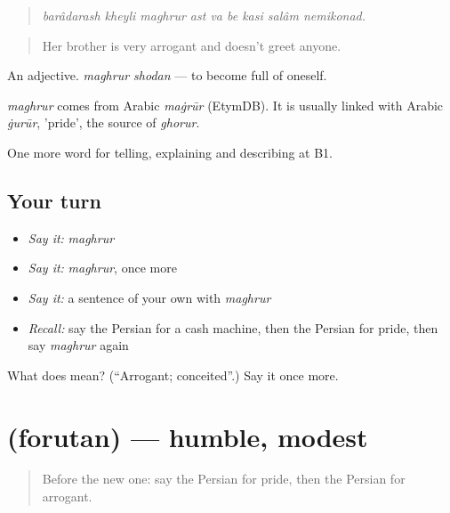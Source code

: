 \begin{quote}
\emph{barâdarash kheyli maghrur ast va be kasi salâm nemikonad.}
\end{quote}

\begin{quote}
Her brother is very arrogant and doesn't greet anyone.
\end{quote}

An adjective. \emph{maghrur shodan} — to become full of oneself.

\begin{cousinweb}
\emph{maghrur} comes from Arabic \emph{maġrūr} (EtymDB). It is usually linked with Arabic \emph{ġurūr}, 'pride', the source of \emph{ghorur}.
\end{cousinweb}

\begin{grammarlens}[title={What you've built}]
One more word for telling, explaining and describing at B1.
\end{grammarlens}

\subsection*{Your turn}
\begin{itemize}
\raggedright
  \item \emph{Say it:} \emph{maghrur}
  \item \emph{Say it:} \emph{maghrur}, once more
  \item \emph{Say it:} a sentence of your own with \emph{maghrur}
  \item \emph{Recall:} say the Persian for a cash machine, then the Persian for pride, then say \emph{maghrur} again
\end{itemize}

\begin{tcolorbox}[breakable,colback=teal!4,colframe=teal!35!black,title={Before you move on}]
What does  mean? (\textquotedblleft{}Arrogant; conceited\textquotedblright{}.) Say it once more.
\end{tcolorbox}
\section[\texorpdfstring{\fa{فروتن} (forutan)}{فروتن (forutan)}]{ (forutan) — humble, modest}

\label{lesson:FA-C480-forutan}



\begin{quote}
Before the new one: say the Persian for pride, then the Persian for arrogant.
\end{quote}

